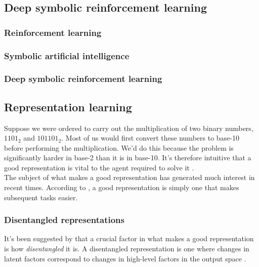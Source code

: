 \documentclass[12pt,twoside]{article}
\begin{document}
\subsection{Deep symbolic reinforcement learning}

\subsubsection{Reinforcement learning}

\subsubsection{Symbolic artificial intelligence}

\subsubsection{Deep symbolic reinforcement learning}

\subsection{Representation learning}

Suppose we were ordered to carry out the multiplication of two binary numbers, $1101_2$ and $101101_2$. Most of us would first convert these numbers to base-10 before performing the multiplication. We'd do this because the problem is significantly harder in base-2 than it is in base-10. It's therefore intuitive that a good representation is vital to the agent required to solve it \cite{IanGoodfellowYoshuaBengio2015}.\\

The subject of what makes a good representation has generated much interest in recent times. According to \cite{IanGoodfellowYoshuaBengio2015}, a good representation is simply one that makes subsequent tasks easier. 

\subsubsection{Disentangled representations}

It's been suggested by \cite{Bengio2013} that a crucial factor in what makes a good representation is how \textit{disentangled} it is. A disentangled representation is one where changes in latent factors correspond to changes in high-level factors in the output space \cite{Higgins2016}.\\
\end{document}
